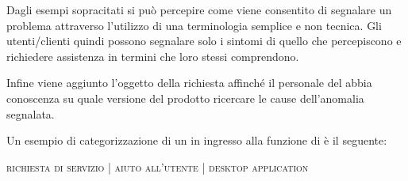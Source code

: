 Dagli esempi sopracitati si può percepire come viene consentito di segnalare un problema attraverso l'utilizzo di una terminologia semplice e non tecnica. Gli utenti/clienti quindi possono segnalare solo i sintomi di quello che percepiscono e richiedere assistenza in termini che loro stessi comprendono.

Infine viene aggiunto l'oggetto  della richiesta affinché il personale del  abbia conoscenza su quale versione del prodotto ricercare le cause dell'anomalia segnalata.

Un esempio di categorizzazione di un  in ingresso alla funzione di  è il seguente:

\begin{center}
\textsc{richiesta di servizio} | \textsc{aiuto all'utente} | \textsc{desktop application}
\end{center}